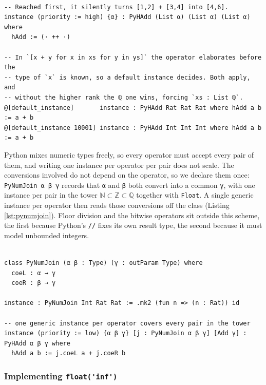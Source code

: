 \documentclass{article}
\newcommand{\code}{\lstinline}
\begin{document}
{\begin{lstlisting}[style=lean,caption={Two places where instance ordering decides the answer.},label={lst:arith-priority}]

-- Reached first, it silently turns [1,2] + [3,4] into [4,6].
instance (priority := high) {α} : PyHAdd (List α) (List α) (List α) where
  hAdd := (· ++ ·)

-- In `[x + y for x in xs for y in ys]` the operator elaborates before the
-- type of `x` is known, so a default instance decides. Both apply, and
-- without the higher rank the ℚ one wins, forcing `xs : List ℚ`.
@[default_instance]       instance : PyHAdd Rat Rat Rat where hAdd a b := a + b
@[default_instance 10001] instance : PyHAdd Int Int Int where hAdd a b := a + b
\end{lstlisting}

Python mixes numeric types freely, so every operator must accept every pair of them, and writing one instance per operator per pair does not scale. The conversions involved do not depend on the operator, so we declare them once: \code{PyNumJoin α β γ} records that \code{α} and \code{β} both convert into a common \code{γ}, with one instance per pair in the tower $\mathbb{N} \subset \mathbb{Z} \subset \mathbb{Q}$ together with \code{Float}. A single generic instance per operator then reads those conversions off the class (Listing \ref{lst:pynumjoin}). Floor division and the bitwise operators sit outside this scheme, the first because Python's \code{//} fixes its own result type, the second because it must model unbounded integers.

\begin{lstlisting}[caption={The numeric tower, declared once and lifted to every operator.},label={lst:pynumjoin}, mathescape=true]

class PyNumJoin (α β : Type) (γ : outParam Type) where
  coeL : α → γ
  coeR : β → γ

instance : PyNumJoin Int Rat Rat := .mk2 (fun n => (n : Rat)) id

-- one generic instance per operator covers every pair in the tower
instance (priority := low) {α β γ} [j : PyNumJoin α β γ] [Add γ] : PyHAdd α β γ where
  hAdd a b := j.coeL a + j.coeR b
\end{lstlisting}

\subsubsection{Implementing \code{float('inf')}} \label{floatinf}

}
\end{document}
